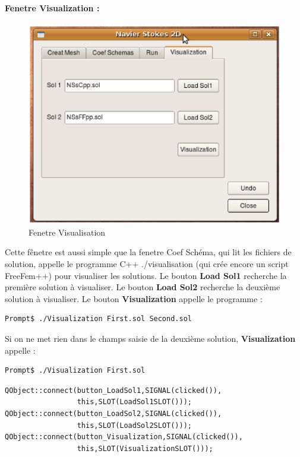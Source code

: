 \documentclass{book}
\begin{document}
\paragraph{Fenetre Visualization :}
\begin{center}
\begin{figure}[h]
 \includegraphics[scale=0.50]{Visualization}
 \caption{Fenetre Visualisation} 
\end{figure}
\end{center}
Cette fênetre est aussi simple que la fenetre Coef Schéma, qui lit les fichiers de solution, appelle le programme C++ ./visualisation (qui crée encore un script FreeFem++) pour visualiser les solutions. Le bouton \textbf{Load Sol1} recherche la première solution à visualiser. Le bouton \textbf{Load Sol2} recherche la deuxième solution à visualiser. Le bouton \textbf{Visualization} appelle le programme :
\begin{lstlisting}
Prompt$ ./Visualization First.sol Second.sol 
\end{lstlisting}
Si on ne met rien dans le champs saisie de la deuxième solution, \textbf{Visualization} appelle :
\begin{lstlisting}
Prompt$ ./Visualization First.sol 
\end{lstlisting}
\begin{lstlisting}
QObject::connect(button_LoadSol1,SIGNAL(clicked()),
                 this,SLOT(LoadSol1SLOT()));
QObject::connect(button_LoadSol2,SIGNAL(clicked()),
                 this,SLOT(LoadSol2SLOT()));
QObject::connect(button_Visualization,SIGNAL(clicked()),
                 this,SLOT(VisualizationSLOT()));
\end{lstlisting}
\end{document}
